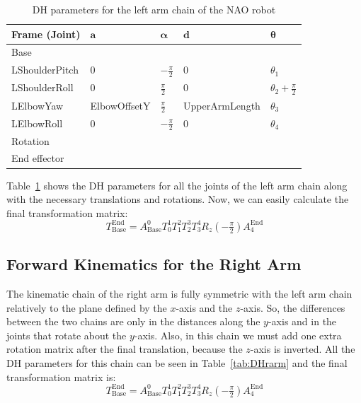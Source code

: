 \begin{table}[t!]
\centering
\caption{DH parameters for the left arm chain of the NAO robot}
\label{tab:DHlarm}
\begin{tabular}{|l|>{\centering\arraybackslash}m{2.55cm}|>{\centering\arraybackslash}m{2.55cm}|>{\centering\arraybackslash}m{2.55cm}|>{\centering\arraybackslash}m{2.55cm}|}
\hline
\textbf{Frame (Joint)} & $\mathbf{a}$ & $\boldsymbol{\alpha}$ & $\mathbf{d}$ & $\boldsymbol{\theta}$\\ \hline
Base & \multicolumn{4}{c|}{$A(0,\text{\footnotesize{ShoulderOffsetY}},\text{\footnotesize{ShoulderOffsetZ}})$} \\ \hline
LShoulderPitch & $0$ & $-\frac{\pi}{2}$ & $0$ & $\theta_1$ \\ \hline
LShoulderRoll & $0$ & $\frac{\pi}{2}$ & $0$ & $\theta_2 + \frac{\pi}{2}$ \\ \hline
LElbowYaw & \footnotesize{ElbowOffsetY} & $\frac{\pi}{2}$ & \footnotesize{UpperArmLength} & $\theta_3$ \\ \hline
LElbowRoll & $0$ & $-\frac{\pi}{2}$ & $0$ & $\theta_4$ \\ \hline
Rotation & \multicolumn{4}{c|}{$R_z(-\frac{\pi}{2})$} \\ \hline
End effector & \multicolumn{4}{c|}{$A(\text{\footnotesize{HandOffsetX+LowerArmLength}},0,0)$} \\ \hline
\end{tabular}
\end{table}

Table~\ref{tab:DHlarm} shows the DH parameters for all the joints of the left arm chain along with the necessary translations and rotations.
Now, we can easily calculate the final transformation matrix:
\[
T^\text{End}_\text{Base} = A^0_\text{Base}T^1_0T^2_1T^3_2T^4_3R_z(-\tfrac{\pi}{2})A^\text{End}_{4}
\]

\subsection{Forward Kinematics for the Right Arm}
The kinematic chain of the right arm is fully symmetric with the left arm chain relatively to the plane defined by the $x$-axis and the $z$-axis. So, the differences between the two chains are only in the distances along the $y$-axis and in the joints that rotate about the $y$-axis. Also, in this chain we must add one extra rotation matrix after the final translation, because the $z$-axis is inverted. All the DH parameters for this chain can be seen in Table~\ref{tab:DHrarm} and the final transformation matrix is:
\[
T^\text{End}_\text{Base} = A^0_\text{Base}T^1_0T^2_1T^3_2T^4_3R_z(-\tfrac{\pi}{2})A^\text{End}_{4}
\]

